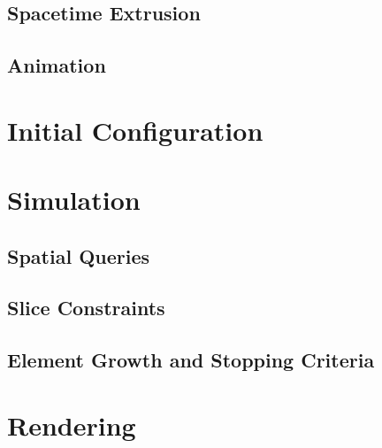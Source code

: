 \subsection{Spacetime Extrusion}


\subsection{Animation}


\section{Initial Configuration}


\section{Simulation}


\subsection{Spatial Queries}


\subsection{Slice Constraints}


\subsection{Element Growth and Stopping Criteria}


\section{Rendering}


